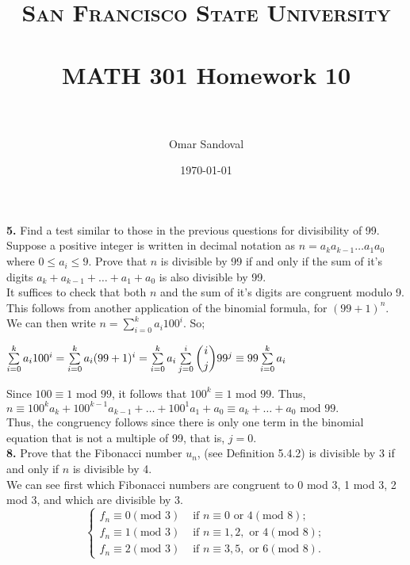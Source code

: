 \documentclass[paper=letter, fontsize=11pt]{scrartcl} %
\title{	
\normalfont \normalsize 
\textsc{San Francisco State University} \\ [25pt]
\horrule{0.5pt} \\[0.4cm] %
\huge MATH 301 Homework 10  \\ %
\horrule{2pt} \\[0.5cm] %
}
\author{Omar Sandoval}
\date{\normalsize\today}
\begin{document}
\maketitle

\textbf{5.} Find a test similar to those in the previous questions for divisibility of
99. \\

Suppose a positive integer is written in decimal notation as $n = a_k a_{k-1} \dots a_1
a_0$ where $0 \le a_i \le 9$. Prove that $n$ is divisible by 99 if and only if the sum 
of it's digits $a_k + a_{k-1} + \dots + a_1 + a_0$ is also divisible by 99. \\

It suffices to check that both $n$ and the sum of it's digits are congruent modulo 9.
This follows from another application of the binomial formula, for $(99+1)^n$. We can
then write $n = \sum_{i=0}^k a_i 100^i$. So;
\begin{center}
    $\sum\limits_{i=0}^k a_i 100^i = \sum\limits_{i=0}^k a_i (99+1)^i = 
    \sum\limits_{i=0}^k a_i \sum\limits_{j=0}^i \dbinom{i}{j} 99^j 
    \equiv 99 \sum\limits_{i=0}^k a_i$
\end{center}
Since $100 \equiv 1 \text{ mod } 99$, it follows that $100^k \equiv 1 \text{ mod } 99$.
Thus, $n \equiv 100^ka_{k} + 100^{k-1}a_{k-1} + \dots + 100^1a_1 + a_0 \equiv a_k + 
\dots + a_0 \text{ mod } 99.$ \\
Thus, the congruency follows since there is only one term in the binomial equation that
is not a multiple of 99, that is, $j = 0$.
\\

\textbf{8.} Prove that the Fibonacci number $u_n$, (see Definition 5.4.2) is divisible 
by 3 if and only if $n$ is divisible by 4. \\

We can see first which Fibonacci numbers are congruent to 0 mod 3, 1 mod 3, 2 mod
3, and which are divisible by 3. \\

\[
\begin{cases}
    f_n \equiv 0 (\text{mod } 3) & \text{ if } n \equiv 0 \text{ or } 4 (\text{mod } 8); \\
    f_n \equiv 1 (\text{mod } 3) & \text{ if } n \equiv 1, 2, \text{ or } 4 (\text{mod } 8); \\
    f_n \equiv 2 (\text{mod } 3) & \text{ if } n \equiv 3, 5, \text{ or } 6 (\text{mod } 8).
\end{cases}
\]
\end{document}
